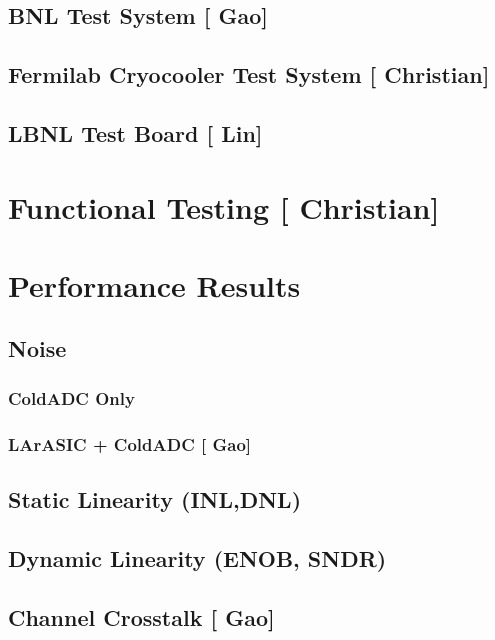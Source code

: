 \documentclass[10pt]{article}
\begin{document}
\subsection{BNL Test System [{\color{red} Gao}] }

\subsection{Fermilab Cryocooler Test System [{\color{red} Christian}] }

\subsection{LBNL Test Board  [{\color{red} Lin}] }



\section{Functional Testing [{\color{red} Christian}] }


	

\section{Performance Results}


\subsection{Noise}
\subsubsection{ColdADC Only}
\subsubsection{LArASIC + ColdADC  [{\color{red} Gao}] }


\subsection{Static Linearity (INL,DNL)}

\subsection{Dynamic Linearity (ENOB, SNDR)}

\subsection{Channel Crosstalk [{\color{red} Gao}] }

\end{document}
